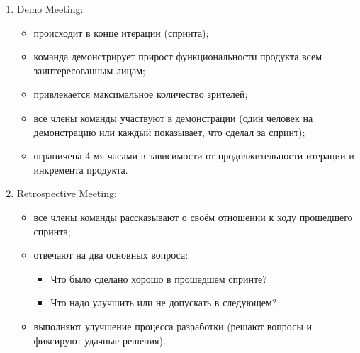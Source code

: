 \documentclass{article}
\begin{document}
\begin{enumerate}
        \item Demo Meeting:
        \begin{itemize}
            \item происходит в конце итерации (спринта);
            \item команда демонстрирует прирост функциональности продукта всем заинтересованным лицам;
            \item привлекается максимальное количество зрителей;
            \item все члены команды участвуют в демонстрации (один человек на демонстрацию или каждый показывает, что сделал за спринт);
            \item ограничена 4-мя часами в зависимости от продолжительности итерации и инкремента продукта.
        \end{itemize}

        \item Retrospective Meeting:
        \begin{itemize}
            \item все члены команды рассказывают о своём отношении к ходу прошедшего спринта;
            \item отвечают на два основных вопроса:
                \begin{itemize}
                    \item Что было сделано хорошо в прошедшем спринте?
                    \item Что надо улучшить или не допускать в следующем?
                 \end{itemize}
            \item выполняют улучшение процесса разработки (решают вопросы и фиксируют удачные решения).
        \end{itemize}
    \end{enumerate}
\end{document}

